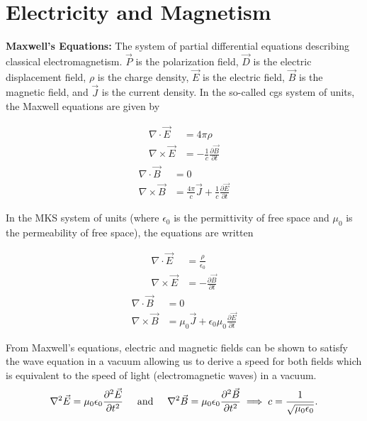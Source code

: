 \chapter{Electricity and Magnetism}
\thispagestyle{fancy}
\textbf{Maxwell's Equations:} The system of partial differential equations describing classical electromagnetism. $\vec{P}$ is the polarization field, $\vec{D}$ is the electric displacement field, $\rho$ is the charge density, $\vec{E}$ is the electric field, $\vec{B}$ is the magnetic field, and $\vec{J}$ is the current density. In the so-called cgs system of units, the Maxwell equations are given by 
\begin{multicols}{2}
	\noindent
\begin{align}
	\nabla \cdot \vec{E} &= 4\pi\rho \\
	\nabla \times \vec{E} &= -\frac{1}{c}\frac{\partial \vec{B}}{\partial t} 
\end{align}
\begin{align}
	\nabla \cdot \vec{B} &= 0 \\
	\nabla \times \vec{B} &= \frac{4\pi}{c}\vec{J}+\frac{1}{c}\frac{\partial \vec{E}}{\partial t} 
\end{align}
\end{multicols}
In the MKS system of units (where $\epsilon_0$ is the permittivity of free space and $\mu_0$ is the permeability of free space), the equations are written 
\begin{multicols}{2}
	\noindent
	\begin{align}
		\nabla \cdot \vec{E} &= \frac{\rho}{\epsilon_0}\\
		\nabla \times \vec{E} &= -\frac{\partial \vec{B}}{\partial t} 
	\end{align}
	\begin{align}
		\nabla \cdot \vec{B} &= 0 \\
		\nabla \times \vec{B} &= \mu_0\vec{J}+\epsilon_0\mu_0\frac{\partial \vec{E}}{\partial t} 
	\end{align}
\end{multicols}
From Maxwell's equations, electric and magnetic fields can be shown to satisfy the wave equation in a vacuum allowing us to derive a speed for both fields which is equivalent to the speed of light (electromagnetic waves) in a vacuum.
\begin{align}
	\nabla^2 \vec{E} = \mu_0\epsilon_0 \frac{\partial^2 \vec{E}}{\partial t^2} \andspace{0.5cm} \nabla^2 \vec{B} = \mu_0\epsilon_0 \frac{\partial^2 \vec{B}}{\partial t^2} \implies c=\frac{1}{\sqrt{\mu_0\epsilon_0}}.
\end{align}
